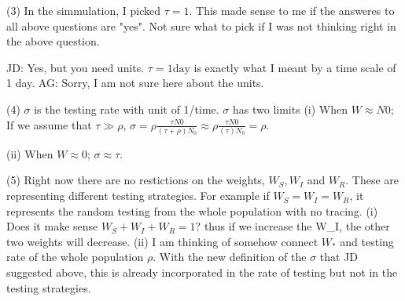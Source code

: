 (3) In the simmulation, I picked $\tau=1$. This made sense to me if the answeres to all above questions are "yes". Not sure what to pick if I was not thinking right in the above question.

JD: Yes, but you need units. $\tau = 1 \mathrm{day}$ is exactly what I meant by a time scale of 1 day. 
AG: Sorry, I am not sure here about the units.

(4) $\sigma$ is the testing rate with unit of 1/time. $\sigma$ has two limits
(i) When $W \approx N0$;
If we assume that $\tau \gg \rho$, $\sigma=\rho \frac{\tau N0}{(\tau+\rho)N_0} \approx \rho \frac{\tau N0}{(\tau)N_0} = \rho$. 

(ii) When $W \approx 0$;
$\sigma \approx \tau$.

(5) Right now there are no restictions on the weights, $W_S, W_I$ and $W_R$. These are representing different testing strategies. For example if $W_S=W_I=W_R$, it represents the random testing from the whole population with no tracing.
(i) Does it make sense $W_S+W_I+W_R=1$? thus if we increase the W_I, the other two weights will decrease.
(ii) I am thinking of somehow connect $W_*$ and testing rate of the whole population $\rho$. With the new definition of the $\sigma$ that JD suggested above, this is already incorporated in the rate of testing but not in the testing strategies. 

